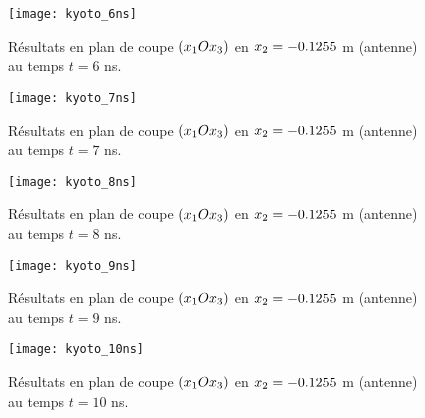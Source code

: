 \begin{figure}[!h]
	\centering
	\caption{
		\label{img:annexe_kyoto_cutplane_6ns}
		Résultats en plan de coupe $(x_1 O x_3)$
		en $x_2 = -0.1255$ m (antenne)
		au temps $t=6$ ns.
	}
	\texttt{[image: kyoto\_6ns]}
\end{figure}

\begin{figure}[!h]
	\centering
	\caption{
		\label{img:annexe_kyoto_cutplane_7ns}
		Résultats en plan de coupe $(x_1 O x_3)$
		en $x_2 = -0.1255$ m (antenne)
		au temps $t=7$ ns.
	}
	\texttt{[image: kyoto\_7ns]}
\end{figure}

\begin{figure}[!h]
	\centering
	\caption{
		\label{img:annexe_kyoto_cutplane_8ns}
		Résultats en plan de coupe $(x_1 O x_3)$
		en $x_2 = -0.1255$ m (antenne)
		au temps $t=8$ ns.
	}
	\texttt{[image: kyoto\_8ns]}
\end{figure}

\begin{figure}[!h]
	\centering
	\caption{
		\label{img:annexe_kyoto_cutplane_9ns}
		Résultats en plan de coupe $(x_1 O x_3)$
		en $x_2 = -0.1255$ m (antenne)
		au temps $t=9$ ns.
	}
	\texttt{[image: kyoto\_9ns]}
\end{figure}

\begin{figure}[!h]
	\centering
	\caption{
		\label{img:annexe_kyoto_cutplane_10ns}
		Résultats en plan de coupe $(x_1 O x_3)$
		en $x_2 = -0.1255$ m (antenne)
		au temps $t=10$ ns.
	}
	\texttt{[image: kyoto\_10ns]}
\end{figure}

